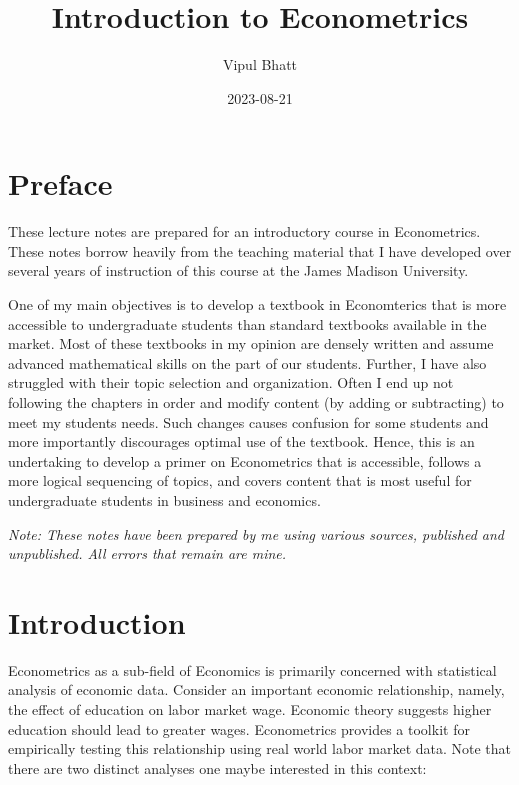 \documentclass[
]{book}
\title{Introduction to Econometrics}
\author{Vipul Bhatt}
\date{2023-08-21}
\theoremstyle{definition}
\theoremstyle{definition}
\theoremstyle{definition}
\theoremstyle{definition}
\theoremstyle{remark}
\begin{document}
\maketitle

{
\setcounter{tocdepth}{1}
\tableofcontents
}
\hypertarget{preface}{%
\chapter*{Preface}\label{preface}}

These lecture notes are prepared for an introductory course in Econometrics. These notes borrow heavily from the teaching material that I have developed over several years of instruction of this course at the James Madison University.

One of my main objectives is to develop a textbook in Economterics that is more accessible to undergraduate students than standard textbooks available in the market. Most of these textbooks in my opinion are densely written and assume advanced mathematical skills on the part of our students. Further, I have also struggled with their topic selection and organization. Often I end up not following the chapters in order and modify content (by adding or subtracting) to meet my students needs. Such changes causes confusion for some students and more importantly discourages optimal use of the textbook. Hence, this is an undertaking to develop a primer on Econometrics that is accessible, follows a more logical sequencing of topics, and covers content that is most useful for undergraduate students in business and economics.

\emph{Note: These notes have been prepared by me using various sources, published and unpublished. All errors that remain are mine.}

\hypertarget{intro}{%
\chapter*{Introduction}\label{intro}}

Econometrics as a sub-field of Economics is primarily concerned with statistical analysis of economic data. Consider an important economic relationship, namely, the effect of education on labor market wage. Economic theory suggests higher education should lead to greater wages. Econometrics provides a toolkit for empirically testing this relationship using real world labor market data. Note that there are two distinct analyses one maybe interested in this context:
\end{document}
